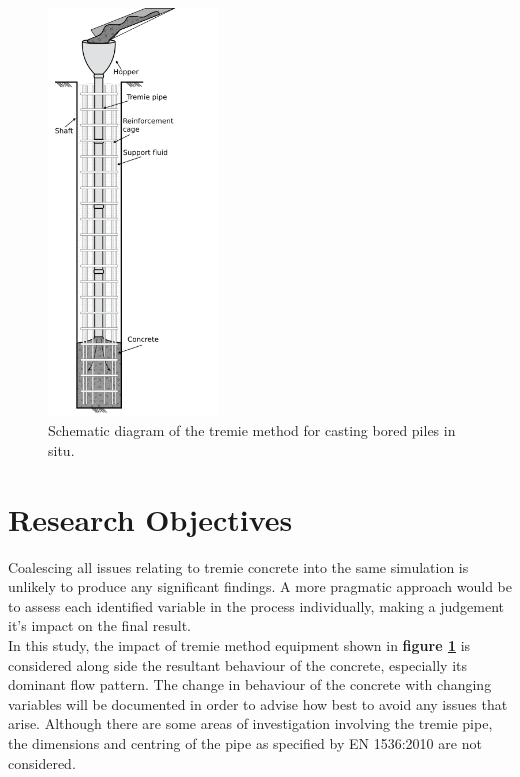 \begin{figure}[H]
\centering
\includegraphics[width=0.4\textwidth]{tremie_empty.png}
\caption{\label{fig:tremie_blank} Schematic diagram of the tremie method for casting bored piles in situ.}
\end{figure}

\section{Research Objectives}
Coalescing all issues relating to tremie concrete into the same simulation is unlikely to produce any significant findings. A more pragmatic approach would be to assess each identified variable in the process individually, making a judgement it's impact on the final result.\\

\noindent
In this study, the impact of tremie method equipment shown in {\bfseries figure \ref{fig:tremie_blank}} is considered along side the resultant behaviour of the concrete, especially its dominant flow pattern. The change in behaviour of the concrete with changing variables will be documented in order to advise how best to avoid any issues that arise. Although there are some areas of investigation involving the tremie pipe, the dimensions and centring of the pipe as specified by EN 1536:2010 are not considered. 

